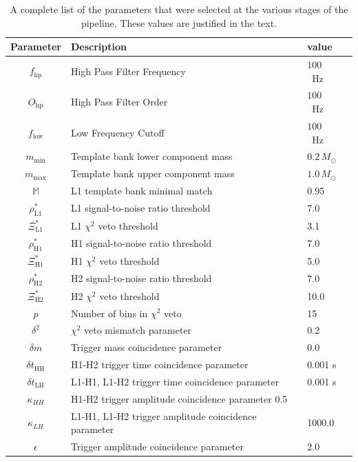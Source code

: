 \begin{table}[p]
\begin{tabular}{cllr}
Parameter & Description  & value \\
\hline 
$f_\mathrm{hp}$ & High Pass Filter Frequency  & $100$~Hz \\
$O_\mathrm{hp}$ & High Pass Filter Order  & $100$~Hz \\
$f_\mathrm{low}$ & Low Frequency Cutoff  & $100$~Hz \\
$m_\mathrm{min}$ & Template bank lower component mass  & $0.2\,M_\odot$ \\
$m_\mathrm{max}$ & Template bank upper component mass  & $1.0\,M_\odot$ \\
$\mathbb{M}$ & L1 template bank minimal match  & 0.95 \\
$\rho^\ast_\mathrm{L1}$ & L1 signal-to-noise ratio threshold & 7.0 \\
$\Xi^\ast_\mathrm{L1}$ & L1 $\chi^2$ veto threshold & 3.1 \\
$\rho^\ast_\mathrm{H1}$ & H1 signal-to-noise ratio threshold & 7.0 \\
$\Xi^\ast_\mathrm{H1}$ & H1 $\chi^2$ veto threshold & 5.0 \\
$\rho^\ast_\mathrm{H2}$ & H2 signal-to-noise ratio threshold & 7.0 \\
$\Xi^\ast_\mathrm{H2}$ & H2 $\chi^2$ veto threshold & 10.0 \\
$p$ & Number of bins in $\chi^2$ veto & 15 \\
$\delta^2$ & $\chi^2$ veto mismatch parameter & 0.2 \\
$\delta m$ & Trigger mass coincidence parameter & 0.0 \\
$\delta t_\mathrm{HH}$ & H1-H2 trigger time coincidence parameter & 0.001 s \\
$\delta t_\mathrm{LH}$ & L1-H1, L1-H2 trigger time coincidence parameter & 0.001 s \\
$\kappa_{HH}$ & H1-H2 trigger amplitude coincidence parameter 0.5 \\
$\kappa_{LH}$ & L1-H1, L1-H2 trigger amplitude coincidence parameter & 1000.0 \\
$\epsilon$ & Trigger amplitude coincidence parameter & 2.0
\end{tabular}
\caption[Pipeline Parameters used in S2 BBHMACHO Search]{%
\label{t:ifo_params}%
A complete list of the parameters that were selected at the various
stages of the pipeline. These values are justified in the text.
}
\end{table}

